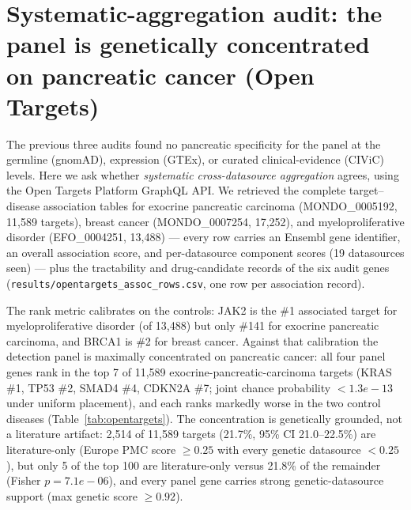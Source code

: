 \section{Systematic-aggregation audit: the panel is genetically concentrated on pancreatic cancer (Open Targets)}
The previous three audits found no pancreatic specificity for the panel at the
germline (gnomAD), expression (GTEx), or curated clinical-evidence (CIViC)
levels. Here we ask whether \emph{systematic cross-datasource aggregation}
agrees, using the Open Targets Platform GraphQL API. We retrieved the complete
target--disease association tables for exocrine pancreatic carcinoma
(MONDO\_0005192, 11,589 targets), breast cancer (MONDO\_0007254, 17,252), and
myeloproliferative disorder (EFO\_0004251, 13,488) --- every row carries an
Ensembl gene identifier, an overall association score, and per-datasource
component scores (19 datasources seen) --- plus the
tractability and drug-candidate records of the six audit genes
(\texttt{results/opentargets\_assoc\_rows.csv}, one row per association
record).

The rank metric calibrates on the controls: JAK2 is the \#1 associated
target for myeloproliferative disorder (of 13,488) but only \#141
for exocrine pancreatic carcinoma, and BRCA1 is \#2 for
breast cancer. Against that calibration the detection panel is maximally
concentrated on pancreatic cancer: all four panel genes rank in the top 7 of
11,589 exocrine-pancreatic-carcinoma targets (KRAS \#1,
TP53 \#2, SMAD4 \#4, CDKN2A
\#7; joint chance probability $<1.3e-13$
under uniform placement), and each ranks markedly worse in the two control
diseases (Table~\ref{tab:opentargets}). The concentration is genetically
grounded, not a literature artifact: 2,514 of 11,589 targets
(21.7\%, 95\% CI 21.0--22.5\%) are literature-only
(Europe PMC score $\ge0.25$ with every genetic datasource $<0.25$), but only
5 of the top 100 are literature-only versus 21.8\% of the
remainder (Fisher $p=7.1e-06$), and every
panel gene carries strong genetic-datasource support (max genetic score
$\ge0.92$).

